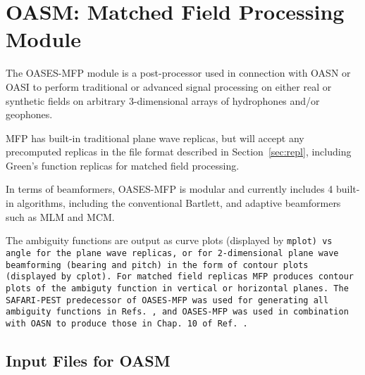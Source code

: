 \section{OASM: Matched Field Processing Module}

The OASES-MFP module is a post-processor used in connection with OASN or OASI
to perform traditional or advanced signal processing on either real or
synthetic fields on arbitrary 3-dimensional arrays of hydrophones
and/or geophones. 

MFP has built-in traditional plane wave replicas,
but will accept any precomputed replicas in the file format described in
Section~\ref{sec:repl}, including Green's function replicas for
matched field processing.

In terms of beamformers, OASES-MFP is modular and currently includes 4
built-in algorithms, including the conventional Bartlett, and adaptive
beamformers such as  MLM and MCM.

The ambiguity functions are output as curve plots (displayed by \tt mplot\rm)
vs angle for the plane wave replicas, or for 2-dimensional plane wave
beamforming (bearing and pitch) in the form of contour plots
(displayed by \tt cplot\rm). For
matched field replicas MFP produces contour plots of the ambiguty
function in vertical or horizontal planes.        
The SAFARI-PEST
predecessor of OASES-MFP was used for generating all ambiguity functions in
Refs.~\cite{bks:jasa88,sbk:jasa90}, and OASES-MFP was used in
combination with OASN to produce those in Chap.~10 of Ref.~\cite{jkps}.

\subsection{Input Files for OASM}

